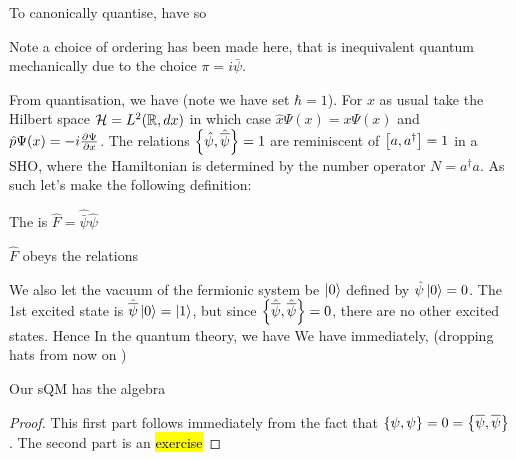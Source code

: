 \documentclass{article}
\begin{document}
To canonically quantise, have 
so 
\begin{remark}
	Note a choice of ordering has been made here, that is inequivalent quantum mechanically due to the choice $\pi = i\bar{\psi}$. 
\end{remark}
From quantisation, we have 
(note we have set $\hbar=1$). For $x$ as usual take the Hilbert space $\mc{H} = L^2 ( \mbb{R}, dx)$ in which case $\hat{x} \Psi(x) = x\Psi(x)$ and $\hat{p} \Psi(x) = -i \pd[\Psi]{x}$. The relations $\acomm[\hat{\psi}]{\hat{\bar{\psi}}}=1$ are reminiscent of $\comm[a]{a^\dagger}=1$ in a SHO, where the Hamiltonian is determined by the number operator $N=a^\dagger a$. As such let's make the following definition:
\begin{definition}
	The  is $\hat{F} = \hat{\bar{\psi}}\hat{\psi}$
\end{definition}
\begin{prop}
	$\hat{F}$ obeys the relations 
	\eq{
		\comm[\hat{F}]{\hat{\psi}} &= -\hat{\psi} \\
		\comm[\hat{F}]{\hat{\bar{\psi}}} &= \hat{\bar{\psi}}
	}
\end{prop}

We also let the vacuum of the fermionic system be $\ket{0}$ defined by $\hat{\psi}\ket{0}=0$. The 1st excited state is $\hat{\bar{\psi}}\ket{0} = \ket{1}$, but since $\acomm[\hat{\bar{\psi}}]{\hat{\bar{\psi}}}=0$, there are no other excited states. Hence 
In the quantum theory, we have 
We have immediately, (dropping hats from now on )
\begin{lemma} Our sQM has the algebra 
\end{lemma}
\begin{proof}
	This first part follows immediately from the fact that $\acomm[\psi]{\psi} = 0 = \acomm[\bar{\psi}]{\bar{\psi}}$. The second part is an \hl{exercise}
\end{proof}
\end{document}
